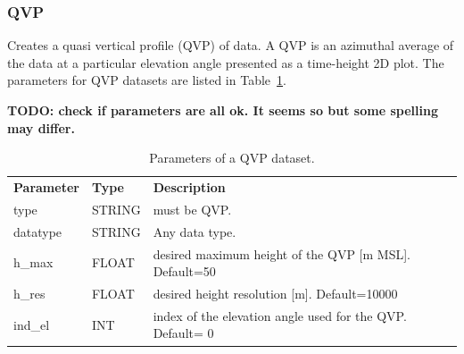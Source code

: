 \documentclass[a4paper,11pt,pdftex,twoside]{scrartcl}
\renewcommand{\bf}{\normalfont \bfseries}
\begin{document}
{{{%


\subsubsection{QVP}
\label{subsec_qvp}
Creates a quasi vertical profile (QVP) of data. A QVP is an azimuthal average of the data at a particular elevation angle presented as a time-height 2D plot. The parameters for QVP datasets are listed in Table~\ref{tab_dataset_qvp}.

{\bf TODO: check if parameters are all ok. It seems so but some spelling may differ.}

\begin{table}[H]
\begin{tabularx}{\textwidth}{llX}
\bf{Parameter}  & \bf{Type}  & \bf{Description}\\
type        & STRING    & must be QVP.\\
datatype    & STRING    & Any data type.\\
h\_max    & FLOAT     & desired maximum height of the QVP [m MSL]. Default=50\\
h\_res    & FLOAT    & desired height resolution [m]. Default=10000\\
ind\_el    & INT    & index of the elevation angle used for the QVP. Default= 0\\
\end{tabularx}
\caption{Parameters of a QVP dataset.}
\label{tab_dataset_qvp}
\end{table}

}}}
\end{document}
